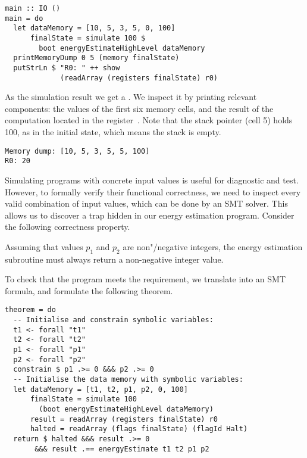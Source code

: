 \begin{verbatim}
main :: IO ()
main = do
  let dataMemory = [10, 5, 3, 5, 0, 100]
      finalState = simulate 100 $
        boot energyEstimateHighLevel dataMemory
  printMemoryDump 0 5 (memory finalState)
  putStrLn $ "R0: " ++ show
             (readArray (registers finalState) r0)
\end{verbatim}

\noindent
As the simulation result we get a . We inspect it by
printing relevant components: the values of the first six memory cells, and the
result of the computation located in the register~. Note that the stack
pointer (cell 5) holds 100, as in the initial state, which means the stack is empty.

\begin{verbatim}
Memory dump: [10, 5, 3, 5, 5, 100]
R0: 20
\end{verbatim}

Simulating programs with concrete input values is useful for diagnostic and test.
However, to formally verify their functional correctness, we need to inspect
every valid combination of input values, which can be done by an SMT solver.
This allows us to discover a trap hidden in our energy estimation program.
Consider the following correctness property.


\begin{tcolorbox}

Assuming that values $p_1$ and $p_2$ are non"/negative integers, the energy
estimation subroutine must always return a non-negative integer value.

\end{tcolorbox}

To check that the program meets the requirement, we translate
 into an SMT formula,
and formulate the following theorem.

\begin{verbatim}
theorem = do
  -- Initialise and constrain symbolic variables:
  t1 <- forall "t1"
  t2 <- forall "t2"
  p1 <- forall "p1"
  p2 <- forall "p2"
  constrain $ p1 .>= 0 &&& p2 .>= 0
  -- Initialise the data memory with symbolic variables:
  let dataMemory = [t1, t2, p1, p2, 0, 100]
      finalState = simulate 100
        (boot energyEstimateHighLevel dataMemory)
      result = readArray (registers finalState) r0
      halted = readArray (flags finalState) (flagId Halt)
  return $ halted &&& result .>= 0
       &&& result .== energyEstimate t1 t2 p1 p2
\end{verbatim}

